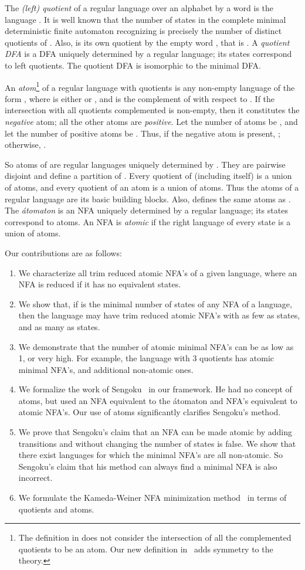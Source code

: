 \documentclass{llncs}
\newcommand{\be}{\begin{enumerate}}
\newcommand{\ee}{\end{enumerate}}
\begin{document}
The \emph{(left) quotient} of a regular language  over an 
alphabet  by a word  is the language 
.
It is well known that the number of states in the complete minimal 
deterministic finite automaton recognizing  is precisely 
the number of distinct quotients of . 
Also,  is its own quotient by the empty word , that is .
A \emph{quotient DFA} is a DFA uniquely determined by a regular language; its states correspond to left quotients. The quotient DFA is isomorphic to the minimal DFA.

An \emph{atom}\footnote{The definition in \cite{BrTa11} does not consider 
the intersection of all the complemented quotients to be an atom. 
Our new definition in~\cite{BrTa12} adds symmetry to the theory.}
of a regular language  with quotients  is any 
non-empty language of the form 
, 
where  is either  or , and  is the complement of  with respect to .   
If the intersection with all quotients complemented is non-empty, then it constitutes the \emph{negative} atom;  
all the other atoms are \emph{positive}.
Let the number of atoms be , and let the number of positive atoms be . 
Thus, if the negative atom is present, ; otherwise, .

So atoms of  are regular languages uniquely determined by . 
They are pairwise disjoint and define a partition of . 
Every quotient of  (including  itself)  
is a union of atoms, and  every quotient of an atom is a union of atoms.
Thus the atoms of a regular language are its basic building blocks. 
Also,  defines the same atoms as   . 
The \emph{\'atomaton} is an NFA uniquely determined by a regular language; its states correspond to atoms. 
An NFA is \emph{atomic} if the right language of every state is a union of atoms.
\smallskip

Our contributions are as follows: 
\be
\item 
We characterize all trim reduced atomic NFA's of a given language, where 
an NFA is reduced if it has no equivalent states. 
\item
We show that, if  is the minimal number of states of any NFA of a language,  then the language may have trim reduced atomic NFA's 
with as few as  states, and as many as  states.
\item
We demonstrate that the number of atomic minimal NFA's  can be 
as low as 1, or very high. For example, the language  with 3 
quotients has  atomic minimal NFA's, and additional non-atomic ones.
\item
We formalize the work of Sengoku~\cite{Sen92} in our framework. He had no concept of atoms, but used an NFA equivalent to the \'atomaton 
and NFA's equivalent to atomic NFA's.
Our use of atoms  significantly clarifies Sengoku's method.
\item
We prove that Sengoku's claim that an NFA can be made atomic by adding transitions and without changing the number of states is false.
We show that there exist languages for which the minimal NFA's are all non-atomic. 
So  Sengoku's claim that his method can always find a minimal NFA is also incorrect.
\item
We formulate the Kameda-Weiner NFA minimization method~\cite{KaWe70} in terms of 
quotients and atoms.
\ee 
\end{document}
